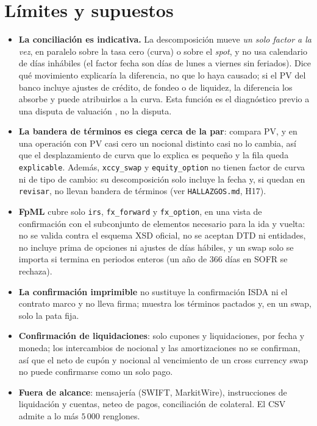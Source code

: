 \section{Límites y supuestos}\label{sec:cap11-limites}

\begin{limites}
  \begin{itemize}
    \item \textbf{La conciliación es indicativa.} La descomposición mueve \emph{un solo factor a la vez}, en paralelo sobre la tasa cero (curva) o sobre el \emph{spot}, y no usa calendario de días inhábiles (el factor fecha son días de lunes a viernes sin feriados). Dice qué movimiento explicaría la diferencia, no que lo haya causado; si el PV del banco incluye ajustes de crédito, de fondeo o de liquidez, la diferencia los absorbe y puede atribuirlos a la curva. Esta función es el diagnóstico previo a una disputa de valuación \citep{bcbs2015}, no la disputa.
    \item \textbf{La bandera de términos es ciega cerca de la par}: compara PV, y en una operación con PV casi cero un nocional distinto casi no lo cambia, así que el desplazamiento de curva que lo explica es pequeño y la fila queda \texttt{explicable}. Además, \texttt{xccy\_swap} y \texttt{equity\_option} no tienen factor de curva ni de tipo de cambio: su descomposición solo incluye la fecha y, si quedan en \texttt{revisar}, no llevan bandera de términos (ver \texttt{HALLAZGOS.md}, H17).
    \item \textbf{FpML} cubre solo \texttt{irs}, \texttt{fx\_forward} y \texttt{fx\_option}, en una vista de confirmación con el subconjunto de elementos necesario para la ida y vuelta: no se valida contra el esquema XSD oficial, no se aceptan DTD ni entidades, no incluye prima de opciones ni ajustes de días hábiles, y un swap solo se importa si termina en periodos enteros (un año de $366$ días en SOFR se rechaza).
    \item \textbf{La confirmación imprimible} no sustituye la confirmación ISDA ni el contrato marco y no lleva firma; muestra los términos pactados y, en un swap, solo la pata fija.
    \item \textbf{Confirmación de liquidaciones}: solo cupones y liquidaciones, por fecha y moneda; los intercambios de nocional y las amortizaciones no se confirman, así que el neto de cupón y nocional al vencimiento de un cross currency swap no puede confirmarse como un solo pago.
    \item \textbf{Fuera de alcance}: mensajería (SWIFT, MarkitWire), instrucciones de liquidación y cuentas, neteo de pagos, conciliación de colateral. El CSV admite a lo más $5\,000$ renglones.
  \end{itemize}
\end{limites}

